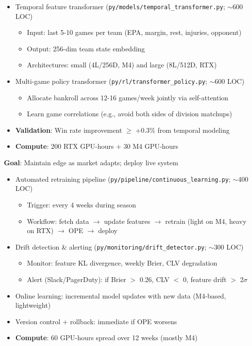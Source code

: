 \begin{itemize}
  \item {} Temporal feature transformer (\texttt{py/models/temporal\_transformer.py}; $\sim$600 LOC)
  \begin{itemize}
    \item Input: last 5-10 games per team (EPA, margin, rest, injuries, opponent)
    \item Output: 256-dim team state embedding
    \item Architectures: small (4L/256D, M4) and large (8L/512D, RTX)
  \end{itemize}
  \item {} Multi-game policy transformer (\texttt{py/rl/transformer\_policy.py}; $\sim$600 LOC)
  \begin{itemize}
    \item Allocate bankroll across 12-16 games/week jointly via self-attention
    \item Learn game correlations (e.g., avoid both sides of division matchups)
  \end{itemize}
  \item {} \textbf{Validation}: Win rate improvement $\ge$ +0.3\% from temporal modeling
  \item \textbf{Compute}: 200 RTX GPU-hours + 30 M4 GPU-hours
\end{itemize}

\textbf{Goal}: Maintain edge as market adapts; deploy live system

\begin{itemize}
  \item {} Automated retraining pipeline (\texttt{py/pipeline/continuous\_learning.py}; $\sim$400 LOC)
  \begin{itemize}
    \item Trigger: every 4 weeks during season
    \item Workflow: fetch data $\to$ update features $\to$ retrain (light on M4, heavy on RTX) $\to$ OPE $\to$ deploy
  \end{itemize}
  \item {} Drift detection \& alerting (\texttt{py/monitoring/drift\_detector.py}; $\sim$300 LOC)
  \begin{itemize}
    \item Monitor: feature KL divergence, weekly Brier, CLV degradation
    \item Alert (Slack/PagerDuty): if Brier $>$ 0.26, CLV $<$ 0, feature drift $>$ 2$\sigma$
  \end{itemize}
  \item {} Online learning: incremental model updates with new data (M4-based, lightweight)
  \item {} Version control + rollback: immediate if OPE worsens
  \item \textbf{Compute}: 60 GPU-hours spread over 12 weeks (mostly M4)
\end{itemize}

